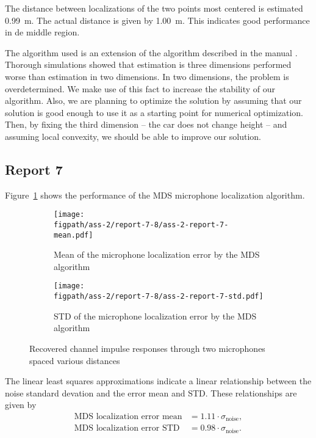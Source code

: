 \documentclass[11pt,titlepage]{report}
\newcommand{\figpath}{../../deliverable-7-resources/figures}
\begin{document}
The distance between localizations of the two points most centered is estimated \SI{0.99}{m}. The actual distance is given by \SI{1.00}{m}. This indicates good performance in de middle region.

The algorithm used is an extension of the algorithm described in the manual \cite{epo4-manual}. Thorough simulations showed that estimation is three dimensions performed worse than estimation in two dimensions. In two dimensions, the problem is overdetermined. We make use of this fact to increase the stability of our algorithm. Also, we are planning to optimize the solution by assuming that our solution is good enough to use it as a starting point for numerical optimization. Then, by fixing the third dimension -- the car does not change height -- and assuming local convexity, we should be able to improve our solution.

\subsection{Report 7}
Figure~\ref{fig:ass-2-rep-7} shows the performance of the MDS microphone localization algorithm.

\begin{figure}[H]
	\begin{subfigure}{.49\textwidth}
		\texttt{[image: \\figpath/ass-2/report-7-8/ass-2-report-7-mean.pdf]}
		\caption{\centering Mean of the microphone localization error by the MDS algorithm}
	\end{subfigure}
	\begin{subfigure}{.49\textwidth}
		\texttt{[image: \\figpath/ass-2/report-7-8/ass-2-report-7-std.pdf]}
		\caption{\centering STD of the microphone localization error by the MDS algorithm}
	\end{subfigure}
	\caption{Recovered channel impulse responses through two microphones spaced various distances}
	\label{fig:ass-2-rep-7}
\end{figure}

The linear least squares approximations indicate a linear relationship between the noise standard devation and the error mean and STD. These relationships are given by
\begin{align*}
	\text{MDS localization error mean}&=1.11 \cdot \sigma_{\text{noise}}, \\
	\text{MDS localization error STD}&=0.98 \cdot \sigma_{\text{noise}}.
\end{align*}
\end{document}
